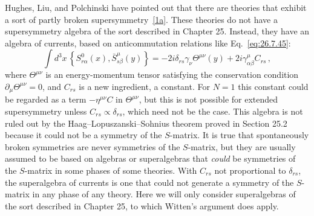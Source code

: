 Hughes, Liu, and Polchinski have pointed out that there are theories that
exhibit a sort of partly broken
supersymmetry~\hyperref[ch29-ref-1a]{[1a]}. These theories do not have a
supersymmetry algebra of the sort described in Chapter 25. Instead, they
have an algebra of currents, based on anticommutation relations like
Eq.~\eqref{eq:26.7.45}:
\[
  \int d^3x\,
  \left\{S^0_{r\alpha}(x),\bar S^\mu_{s\beta}(y)\right\}
  =
  -2i\delta_{rs}\gamma_\nu\Theta^{\mu\nu}(y)
  +2i\gamma^\mu_{\alpha\beta}C_{rs}\,,
\]
where \(\Theta^{\mu\nu}\) is an energy-momentum tensor satisfying the
conservation condition \(\partial_\mu\Theta^{\mu\nu}=0\), and \(C_{rs}\)
is a new ingredient, a constant. For \(N=1\) this constant could be
regarded as a term \(-\eta^{\mu\nu}C\) in \(\Theta^{\mu\nu}\), but this is
not possible for extended supersymmetry unless
\(C_{rs}\propto\delta_{rs}\), which need not be the case. This algebra is
not ruled out by the Haag--Lopuszanski--Sohnius theorem proved in
Section 25.2 because it could not be a symmetry of the \(S\)-matrix. It is
true that spontaneously broken symmetries are never symmetries of the
\(S\)-matrix, but they are usually assumed to be based on algebras or
superalgebras that \emph{could} be symmetries of the \(S\)-matrix in some
phases of some theories. With \(C_{rs}\) not proportional to
\(\delta_{rs}\), the superalgebra of currents is one that could not
generate a symmetry of the \(S\)-matrix in any phase of any theory. Here
we will only consider superalgebras of the sort described in Chapter 25,
to which Witten's argument does apply.

